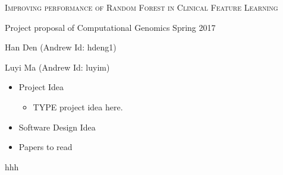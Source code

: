 \documentclass[letterpaper, 12pt]{article}
\begin{document}
\begin{center}
{\Large 
	\textsc{Improving performance of Random Forest in Clinical Feature Learning}
}

\vspace{0.3cm}

\normalsize Project proposal of Computational Genomics Spring 2017

\vspace{0.5cm}

{\small
	Han Den (Andrew Id: hdeng1)
	
	Luyi Ma (Andrew Id: luyim)
}
\end{center}

\begin{itemize}
\item Project Idea

\begin{itemize}
\item
TYPE project idea here. 
~\cite{reference}
\end{itemize}

\item Software Design Idea

\item Papers to read

\end{itemize}

\begin{thebibliography}{1}
hhh
\end{thebibliography}
\end{document}
